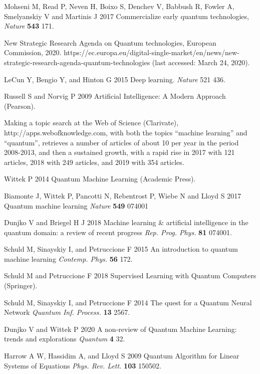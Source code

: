 \documentclass[12pt]{iopart}
\begin{document}
\begin{thebibliography}{999}

 Mohseni M, Read P, Neven H, Boixo S, Denchev V, Babbush R,
Fowler A, Smelyanskiy V and Martinis J 2017 Commercialize early quantum technologies, {\it Nature} {\bf 543} 171.

 New Strategic Research Agenda on Quantum technologies, European Commission, 2020. https://ec.europa.eu/digital-single-market/en/news/new-strategic-research-agenda-quantum-technologies (last accessed: March 24, 2020).

 LeCun Y, Bengio Y, and Hinton G 2015 Deep learning. {\it Nature} 521 436. 

 Russell S and Norvig P 2009 Artificial Intelligence: A Modern Approach (Pearson).

 Making a topic search at the Web of Science (Clarivate), http://apps.webofknowledge.com, with both the topics ``machine learning'' and ``quantum'', retrieves a number of articles of about 10 per year in the period 2008-2013, and then a sustained growth, with a rapid rise in 2017 with 121 articles, 2018 with 249 articles, and 2019 with 354 articles.

 Wittek P 2014 Quantum Machine Learning (Academic Press).

 Biamonte J, Wittek P, Pancotti N, Rebentrost P, Wiebe N and Lloyd S 
2017 Quantum machine learning \textit{Nature} \textbf{549} 074001

 Dunjko V and Briegel H J 2018 Machine learning \& artificial intelligence in the quantum domain: a review of recent progress {\it Rep. Prog. Phys.} {\bf 81} 074001.

 Schuld M, Sinayskiy I, and Petruccione F 2015 An introduction to quantum machine learning {\it Contemp. Phys.} {\bf 56} 172.

 Schuld M and Petruccione F 2018 Supervised Learning with Quantum Computers (Springer).

 Schuld M, Sinayskiy I, and Petruccione F 2014 The quest for a Quantum Neural Network {\it Quantum Inf. Process.} {\bf 13} 2567.

 Dunjko V and Wittek P 2020 A non-review of Quantum Machine Learning: trends and explorations {\it Quantum} {\bf 4} 32.

 Harrow A W, Hassidim A, and Lloyd S 2009 Quantum Algorithm for Linear Systems of Equations {\it Phys. Rev. Lett.} {\bf 103} 150502.


\end{thebibliography}
\end{document}
